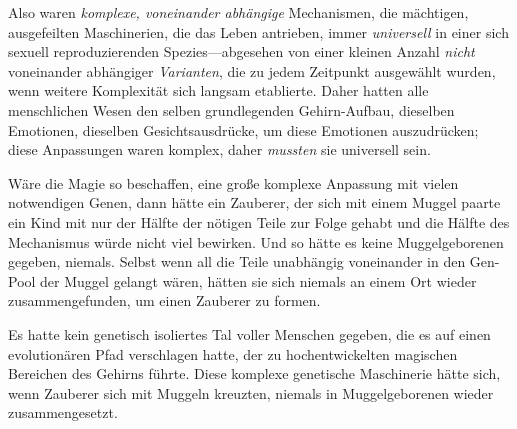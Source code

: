 Also waren \emph{komplexe, voneinander abhängige} Mechanismen, die mächtigen, ausgefeilten Maschinerien, die das Leben antrieben, immer \emph{universell} in einer sich sexuell reproduzierenden Spezies—abgesehen von einer kleinen Anzahl \emph{nicht} voneinander abhängiger \emph{Varianten}, die zu jedem Zeitpunkt ausgewählt wurden, wenn weitere Komplexität sich langsam etablierte. Daher hatten alle menschlichen Wesen den selben grundlegenden Gehirn-Aufbau, dieselben Emotionen, dieselben Gesichtsausdrücke, um diese Emotionen auszudrücken; diese Anpassungen waren komplex, daher \emph{mussten} sie universell sein.

Wäre die Magie so beschaffen, eine große komplexe Anpassung mit vielen notwendigen Genen, dann hätte ein Zauberer, der sich mit einem Muggel paarte ein Kind mit nur der Hälfte der nötigen Teile zur Folge gehabt und die Hälfte des Mechanismus würde nicht viel bewirken. Und so hätte es keine Muggelgeborenen gegeben, niemals. Selbst wenn all die Teile unabhängig voneinander in den Gen-Pool der Muggel gelangt wären, hätten sie sich niemals an einem Ort wieder zusammengefunden, um einen Zauberer zu formen.

Es hatte kein genetisch isoliertes Tal voller Menschen gegeben, die es auf einen evolutionären Pfad verschlagen hatte, der zu hochentwickelten magischen Bereichen des Gehirns führte. Diese komplexe genetische Maschinerie hätte sich, wenn Zauberer sich mit Muggeln kreuzten, niemals in Muggelgeborenen wieder zusammengesetzt.

